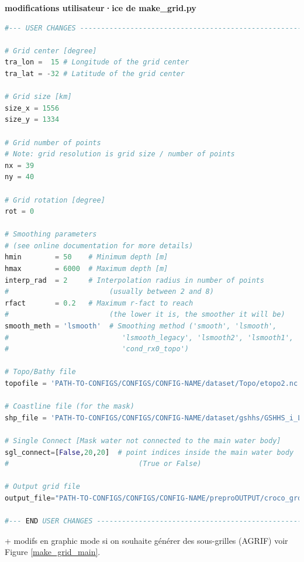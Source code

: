 \documentclass[10pt,a4paper,titlepage]{article}
\begin{document}
\begin{codeEnv}{\textbf{modifications utilisateur·ice de make\_grid.py}}
\begin{lstlisting}[language=python]
#--- USER CHANGES ---------------------------------------------------------

# Grid center [degree]
tra_lon =  15 # Longitude of the grid center
tra_lat = -32 # Latitude of the grid center

# Grid size [km]
size_x = 1556
size_y = 1334

# Grid number of points
# Note: grid resolution is grid size / number of points
nx = 39
ny = 40

# Grid rotation [degree]
rot = 0

# Smoothing parameters
# (see online documentation for more details)
hmin        = 50    # Minimum depth [m]
hmax        = 6000  # Maximum depth [m]
interp_rad  = 2     # Interpolation radius in number of points
#                        (usually between 2 and 8)
rfact       = 0.2   # Maximum r-fact to reach
#                        (the lower it is, the smoother it will be)
smooth_meth = 'lsmooth'  # Smoothing method ('smooth', 'lsmooth',
#                           'lsmooth_legacy', 'lsmooth2', 'lsmooth1',
#                           'cond_rx0_topo')

# Topo/Bathy file
topofile = 'PATH-TO-CONFIGS/CONFIGS/CONFIG-NAME/dataset/Topo/etopo2.nc'

# Coastline file (for the mask)
shp_file = 'PATH-TO-CONFIGS/CONFIGS/CONFIG-NAME/dataset/gshhs/GSHHS_i_L1.shp'

# Single Connect [Mask water not connected to the main water body]
sgl_connect=[False,20,20]  # point indices inside the main water body
#                               (True or False)

# Output grid file
output_file="PATH-TO-CONFIGS/CONFIGS/CONFIG-NAME/preproOUTPUT/croco_grd.nc"

#--- END USER CHANGES -----------------------------------------------------
\end{lstlisting}
\end{codeEnv}
+ modifs en graphic mode si on souhaite générer des sous-grilles (AGRIF) voir Figure \ref{make_grid_main}.
\end{document}
